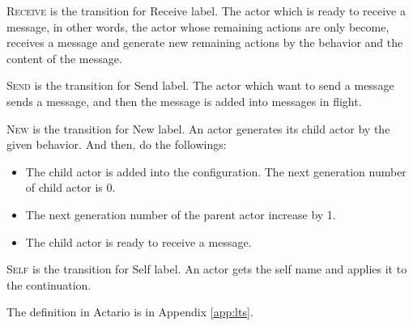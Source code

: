 \begin{description}[style=nextline,leftmargin=12pt,parsep=0pt]
\item[\textsc{Receive}]
  \textsc{Receive} is the transition for \textsf{Receive} label.
  The actor which is ready to receive a message, in other words, the actor whose remaining actions are only \textsf{become}, receives a message and generate new remaining actions by the behavior and the content of the message.
\item[\textsc{Send}]
  \textsc{Send} is the transition for \textsf{Send} label.
  The actor which want to send a message sends a message, and then the message is added into messages in flight.
\item[\textsc{New}]
  \textsc{New} is the transition for \textsf{New} label.
  An actor generates its child actor by the given behavior.
  And then, do the followings:
  \begin{itemize}
  \item The child actor is added into the configuration. The next generation number of child actor is 0.
  \item The next generation number of the parent actor increase by 1.
  \item The child actor is ready to receive a message.
  \end{itemize}
\item[\textsc{Self}]
  \textsc{Self} is the transition for \textsf{Self} label.
  An actor gets the self name and applies it to the continuation.
\end{description}

The definition in Actario is in Appendix \ref{app:lts}.

